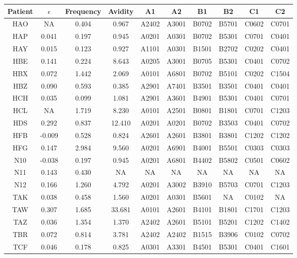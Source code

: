 \begin{table}[htp]
\begin{center}

\begin{sideways}
\begin{tabulary}{1.5\textwidth}{|c|c|c|c|c|c|c|c|c|c|}
\hline
Patient & $\epsilon$ & Frequency & Avidity & A1 & A2 & B1 & B2 & C1 & C2 \bigstrut \\
\hline
HAO & NA & 0.404 & 0.967 & A2402 & A3001 & B0702 & B5701 & C0602 & C0701 \bigstrut[t] \\
HAP & 0.041 & 0.197 & 0.945 & A0201 & A0301 & B0702 & B5301 & C0701 & C0401 \\
HAY & 0.015 & 0.123 & 0.927 & A1101 & A0301 & B1501 & B2702 & C0202 & C0401 \\
HBE & 0.141 & 0.224 & 8.643 & A0205 & A3001 & B0705 & B5301 & C0401 & C0702 \\
HBX & 0.072 & 1.442 & 2.069 & A0101 & A6801 & B0702 & B5101 & C0202 & C1504 \\
HBZ & 0.090 & 0.593 & 0.385 & A2901 & A7401 & B3501 & B3501 & C0401 & C0401 \\
HCH & 0.035 & 0.099 & 1.081 & A2901 & A3601 & B4901 & B5301 & C0401 & C0701 \\
HCL & NA & 1.719 & 8.230 & A0101 & A2501 & B0801 & B1801 & C0701 & C1203 \\
HDS & 0.292 & 0.837 & 12.410 & A0201 & A0201 & B0702 & B3503 & C0401 & C0702 \\
HFB & -0.009 & 0.528 & 0.824 & A2601 & A2601 & B3801 & B3801 & C1202 & C1202 \\
HFG & 0.147 & 2.984 & 9.560 & A0201 & A6901 & B4001 & B5501 & C0303 & C0303 \\
N10 & -0.038 & 0.197 & 0.945 & A0201 & A6801 & B4402 & B5802 & C0501 & C0602 \\
N11 & 0.143 & 0.430 & NA & NA & NA & NA & NA & NA & NA \\
N12 & 0.166 & 1.260 & 4.792 & A0201 & A3002 & B3910 & B5703 & C0701 & C1203 \\
TAK & 0.038 & 0.458 & 1.560 & A0201 & A0301 & B5601 & NA & C0102 & NA \\
TAW & 0.307 & 1.685 & 33.681 & A0101 & A2601 & B4101 & B1801 & C1701 & C1203 \\
TAZ & 0.036 & 1.354 & 1.370 & A2402 & A2601 & B5101 & B5201 & C1202 & C1402 \\
TBR & 0.072 & 0.814 & 3.781 & A2402 & A2402 & B1515 & B3906 & C0102 & C0702 \\
TCF & 0.046 & 0.178 & 0.825 & A0301 & A3301 & B4501 & B5301 & C0401 & C1601 \\

\end{tabulary}
\end{sideways}
\end{center}
\end{table}
